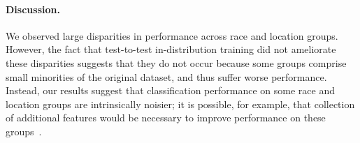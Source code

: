 \begin{table}[tbp]
  \caption{Comparison of precision scores for each borough at a threshold which achieves 60\% global weapon recall. Train set size is 155,929 for both rows.}
  \centering
 \label{tab:sqf_precision_by_borough}
\end{table}

\begin{table}[!t]
  \caption{Model parameters used in this analysis.}
  \centering
 \label{tab:policing_hyperparams}
\end{table}

\paragraph{Discussion.} We observed large disparities in performance across race and location groups. However, the fact that test-to-test in-distribution training did not ameliorate these disparities suggests that they do not occur because some groups comprise small minorities of the original dataset, and thus suffer worse performance. Instead, our results suggest that classification performance on some race and location groups are intrinsically noisier; it is possible, for example, that collection of additional features would be necessary to improve performance on these groups~\citep{chen2018my}.

